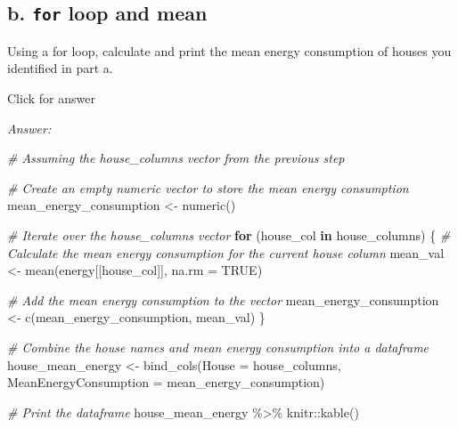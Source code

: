 \documentclass[
]{book}
\newenvironment{Shaded}{\begin{snugshade}}{\end{snugshade}}
\newcommand{\AttributeTok}[1]{\textcolor[rgb]{0.77,0.63,0.00}{#1}}
\newcommand{\CommentTok}[1]{\textcolor[rgb]{0.56,0.35,0.01}{\textit{#1}}}
\newcommand{\ConstantTok}[1]{\textcolor[rgb]{0.00,0.00,0.00}{#1}}
\newcommand{\ControlFlowTok}[1]{\textcolor[rgb]{0.13,0.29,0.53}{\textbf{#1}}}
\newcommand{\FunctionTok}[1]{\textcolor[rgb]{0.00,0.00,0.00}{#1}}
\newcommand{\NormalTok}[1]{#1}
\newcommand{\OtherTok}[1]{\textcolor[rgb]{0.56,0.35,0.01}{#1}}
\newcommand{\SpecialCharTok}[1]{\textcolor[rgb]{0.00,0.00,0.00}{#1}}
\begin{document}
\hypertarget{b.-for-loop-and-mean}{%
\subsection{\texorpdfstring{b. \texttt{for} loop and mean}{b. for loop and mean}}\label{b.-for-loop-and-mean}}

Using a for loop, calculate and print the mean energy consumption of houses you identified in part a.

Click for answer

\emph{Answer:}

\begin{Shaded}
\begin{Highlighting}[]
\CommentTok{\# Assuming the house\_columns vector from the previous step}

\CommentTok{\# Create an empty numeric vector to store the mean energy consumption}
\NormalTok{mean\_energy\_consumption }\OtherTok{\textless{}{-}} \FunctionTok{numeric}\NormalTok{()}

\CommentTok{\# Iterate over the house\_columns vector}
\ControlFlowTok{for}\NormalTok{ (house\_col }\ControlFlowTok{in}\NormalTok{ house\_columns) \{}
  \CommentTok{\# Calculate the mean energy consumption for the current house column}
\NormalTok{  mean\_val }\OtherTok{\textless{}{-}} \FunctionTok{mean}\NormalTok{(energy[[house\_col]], }\AttributeTok{na.rm =} \ConstantTok{TRUE}\NormalTok{)}
  
  \CommentTok{\# Add the mean energy consumption to the vector}
\NormalTok{  mean\_energy\_consumption }\OtherTok{\textless{}{-}} \FunctionTok{c}\NormalTok{(mean\_energy\_consumption, mean\_val)}
\NormalTok{\}}

\CommentTok{\# Combine the house names and mean energy consumption into a dataframe}
\NormalTok{house\_mean\_energy }\OtherTok{\textless{}{-}} \FunctionTok{bind\_cols}\NormalTok{(}\AttributeTok{House =}\NormalTok{ house\_columns, }\AttributeTok{MeanEnergyConsumption =}\NormalTok{ mean\_energy\_consumption)}

\CommentTok{\# Print the dataframe}
\NormalTok{house\_mean\_energy }\SpecialCharTok{\%\textgreater{}\%}\NormalTok{  knitr}\SpecialCharTok{::}\FunctionTok{kable}\NormalTok{()}
\end{Highlighting}
\end{Shaded}
\end{document}
